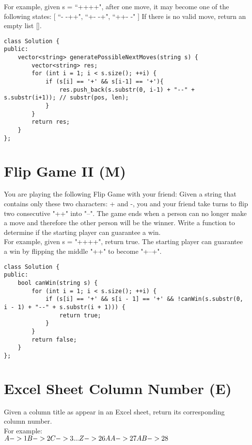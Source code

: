 For example, given s = ``++++", after one move, it may become one of the following states:
[
  ``- -++",
  ``+- -+",
  ``++- -"
]
If there is no valid move, return an empty list [].\\

\begin{lstlisting}
class Solution {
public:
    vector<string> generatePossibleNextMoves(string s) {
        vector<string> res;
        for (int i = 1; i < s.size(); ++i) {
            if (s[i] == '+' && s[i-1] == '+'){
                res.push_back(s.substr(0, i-1) + "--" + s.substr(i+1)); // substr(pos, len);
            }
        }
        return res;
    }
};
\end{lstlisting}


\section{Flip Game II (M)}
You are playing the following Flip Game with your friend: Given a string that contains only these two characters: + and -, you and your friend take turns to flip two consecutive "++" into "--". The game ends when a person can no longer make a move and therefore the other person will be the winner. Write a function to determine if the starting player can guarantee a win.\\

For example, given s = "++++", return true. The starting player can guarantee a win by flipping the middle "++" to become "+--+".\\

\begin{lstlisting}
class Solution {
public:
    bool canWin(string s) {
        for (int i = 1; i < s.size(); ++i) {
            if (s[i] == '+' && s[i - 1] == '+' && !canWin(s.substr(0, i - 1) + "--" + s.substr(i + 1))) {
                return true;
            }
        }
        return false;
    }
};
\end{lstlisting}


\section{Excel Sheet Column Number (E)}
Given a column title as appear in an Excel sheet, return its corresponding column number.\\

For example:\\
$
    A -> 1 \\
    B -> 2 \\
    C -> 3 \\
    ... \\
    Z -> 26\\
    AA -> 27\\
    AB -> 28 $\\

